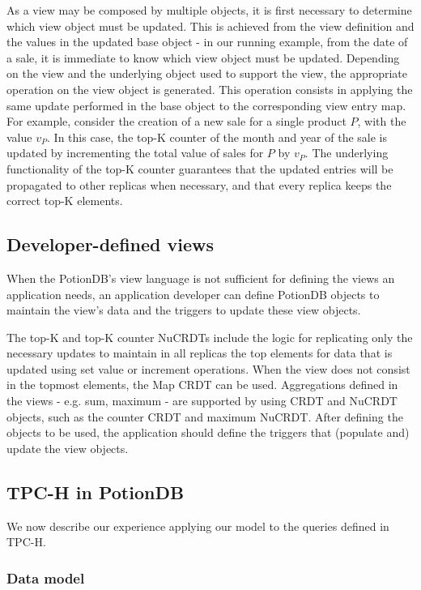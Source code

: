 \documentclass[sigplan,twocolumn,review,anonymous]{acmart}
\begin{document}
As a view may be composed by multiple objects, it is first necessary to 
determine which view object must be updated. This is achieved from the view definition 
and the values in the updated base object - in our running example, 
from the date of a sale, it is immediate to know which view object
must be updated.
Depending on the view and the underlying object used to support the view, the appropriate 
operation on the view object is generated.
This operation consists in applying the same update performed in the base object to the 
corresponding view entry map.
For example, consider the creation of a new sale for a single product $P$, with the value $v_P$. 
In this case, the top-K counter of the month and year of the sale is updated by 
incrementing the total value of sales for $P$ by $v_P$. 
The underlying functionality of the top-K counter guarantees that the updated entries
will be propagated to other replicas when necessary, and that every replica keeps the correct top-K
elements.

\subsection{Developer-defined views}
\label{subsec:programmer_view}

When the PotionDB's view language is not sufficient for defining the views an application needs, 
an application developer can define PotionDB objects to maintain the view's data and the
triggers to update these view objects.

The top-K and top-K counter NuCRDTs include the logic for replicating only the necessary 
updates to maintain in all replicas the top elements for data that is updated using set value 
or increment operations.
When the view does not consist in the topmost elements, the Map CRDT can be used.  
Aggregations defined in the views - e.g. sum, maximum - are supported by using CRDT and NuCRDT 
objects, such as the counter CRDT and maximum NuCRDT.
After defining the objects to be used, the application should define the triggers that (populate and) 
update the view objects. 


\subsection{TPC-H in PotionDB}

We now describe our experience applying our 
model to the queries defined in TPC-H.

\subsubsection{Data model}
\label{subsec:dataset}
\end{document}
